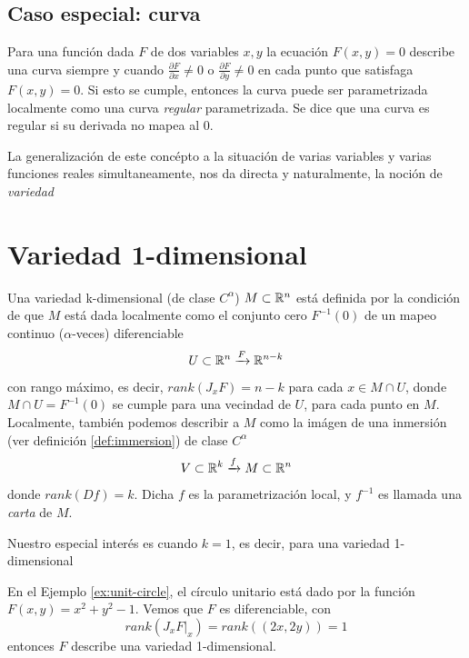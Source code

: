 \subsection{Caso especial: curva}

Para una funci\'on dada $F$ de dos variables $x,y$ la ecuaci\'on $F(x,y) = 0$ describe
una curva siempre y cuando $\frac{\partial F}{\partial x} \ne 0$ o $\frac{\partial F}{\partial y} \ne 0$
en cada punto que satisfaga $F(x,y) = 0$. Si esto se cumple, entonces la curva puede ser
parametrizada localmente como una curva \emph{regular} parametrizada. Se dice que una curva 
es regular si su derivada no mapea al $0$.

La generalizaci\'on de este conc\'epto a la situaci\'on de varias variables y varias funciones
reales simultaneamente, nos da directa y naturalmente, la noci\'on de \emph{variedad}

\section{Variedad 1-dimensional}

\begin{definition}[Variedad]
    Una variedad k-dimensional (de clase $C^{\alpha}$) $M \subset \mathbb{R}^{n}$ está definida por
    la condici\'on  de que $M$ est\'a dada localmente como el conjunto cero $F^{-1}(0)$ de un
    mapeo continuo ($\alpha$-veces) diferenciable
    $$ U \subset \mathbb{R}^{n}  \xrightarrow{F} \mathbb{R}^{n-k}$$
    con rango m\'aximo, es decir, $rank(J_{x}F)= n - k$ para cada $x \in M \cap U$, donde
    $M \cap U = F^{-1}(0)$ se cumple para una vecindad de $U$, para cada punto en $M$. \\
    Localmente, tambi\'en podemos describir a $M$ como la im\'agen de una inmersi\'on (ver
    definici\'on \ref{def:immersion}) de clase $C^{\alpha}$
    $$ V \subset \mathbb{R}^{k} \xrightarrow{f} M \subset \mathbb{R}^{n} $$
    donde $rank(Df)=k$. Dicha $f$ es la parametrizaci\'on local, y $f^{-1}$ es llamada una \emph{carta}
    de $M$.
\end{definition}

Nuestro especial inter\'es es cuando $k=1$, es decir, para una variedad 1-dimensional

\begin{example}
    En el Ejemplo \ref{ex:unit-circle}, el c\'irculo unitario est\'a dado por la funci\'on
    $F(x,y)=x^{2}+y^{2}-1$. Vemos que $F$ es diferenciable,
    con
    $$ rank(J_{x}F|_{x})=rank((2x,2y))=1 $$
    entonces $F$ describe una variedad 1-dimensional.
\end{example}

